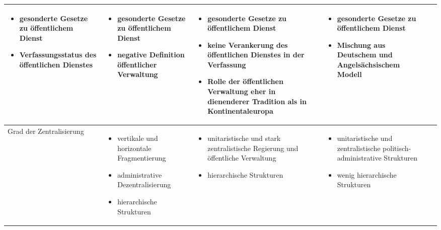 \begin{landscape}
\begin{scriptsize}
\begin{longtable}[H]{|L{4cm}|L{5cm}|L{5cm}|L{5cm}|L{4cm}|}
\begin{itemize}
\item gesonderte Gesetze zu öffentlichem Dienst
\item Verfassungsstatus des öffentlichen Dienstes
\end{itemize}
&
\begin{itemize}
\item gesonderte Gesetze zu öffentlichem Dienst            
\item negative Definition öffentlicher Verwaltung 
\end{itemize}
&
 \vspace{-2mm}
\begin{itemize}
\item gesonderte Gesetze zu öffentlichem Dienst
\item keine Verankerung des öffentlichen Dienstes in der Verfassung
\item Rolle der öffentlichen Verwaltung eher in dienenderer Tradition als in Kontinentaleuropa
 \end{itemize}
\vspace{-3mm}
&
\begin{itemize}
\item gesonderte Gesetze zu öffentlichem Dienst            
\item Mischung aus Deutschem und Angelsächsischem Modell
\end{itemize}\\\hline
Grad der Zentralisierung&
 \vspace{-2mm}
\begin{itemize}
\item vertikale und horizontale Fragmentierung
\item administrative Dezentralisierung
\item hierarchische Strukturen
\end{itemize}
 \vspace{-2mm}
&
\vspace{-1mm}
\begin{itemize}
\item unitaristische und stark zentralistische Regierung und öffentliche Verwaltung
\item hierarchische Strukturen
\end{itemize}
\vspace{-1mm}
 &
\vspace{-1mm}
\begin{itemize}
\item unitaristische und zentralistische politisch-administrative Strukturen
\item wenig hierarchische Strukturen 	

\end{itemize}
\end{longtable}
\end{scriptsize}
\end{landscape}
